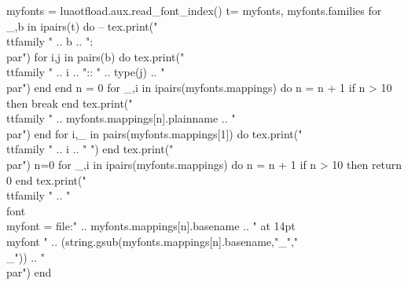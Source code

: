 \documentclass{article}
\begin{document}
\begin{luacode}
  myfonts = luaotfload.aux.read_font_index()
  t={ myfonts, myfonts.families }
  for _,b in ipairs(t) do
    -- tex.print("\\ttfamily " .. b .. ": \\par")
    for i,j in pairs(b) do
      tex.print("\\ttfamily " .. i .. ":: " .. type(j) .. "\\par")
    end
  end
  n = 0
  for _,i in ipairs(myfonts.mappings) do
    n = n + 1
    if n > 10 then break end
    tex.print("\\ttfamily " .. myfonts.mappings[n].plainname .. "\\par")
  end
  for i,_ in pairs(myfonts.mappings[1]) do
    tex.print("\\ttfamily " .. i .. " ")
  end
  tex.print("\\par")
  n=0
  for _,i in ipairs(myfonts.mappings) do
    n = n + 1
    if n > 10 then return 0 end
    tex.print("\\ttfamily "  ..
      "\\font\\myfont = {file:" .. myfonts.mappings[n].basename .. "} at 14pt \\myfont " ..
      (string.gsub(myfonts.mappings[n].basename,"_","\\_")) ..
    "\\par")
  end
\end{luacode}
\end{document}
